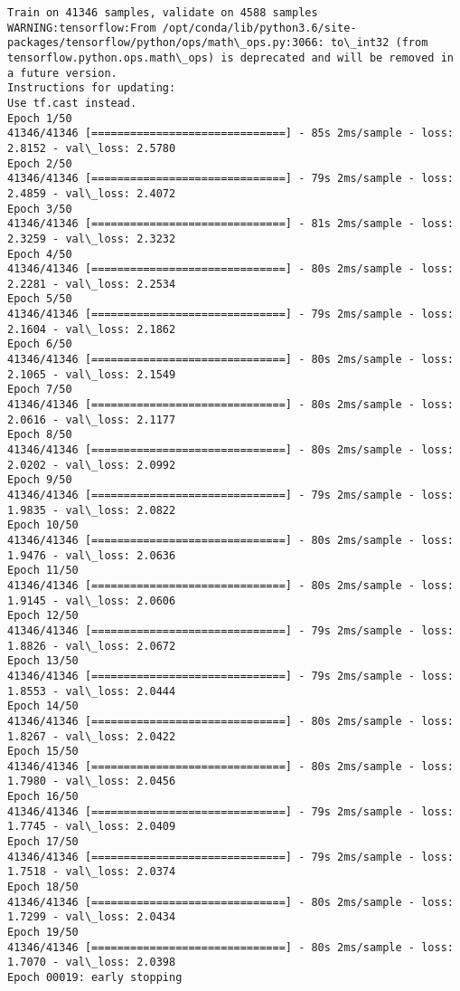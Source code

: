 \documentclass[11pt]{article}
\begin{document}
    \begin{Verbatim}[commandchars=\\\{\}]
Train on 41346 samples, validate on 4588 samples
WARNING:tensorflow:From /opt/conda/lib/python3.6/site-packages/tensorflow/python/ops/math\_ops.py:3066: to\_int32 (from tensorflow.python.ops.math\_ops) is deprecated and will be removed in a future version.
Instructions for updating:
Use tf.cast instead.
Epoch 1/50
41346/41346 [==============================] - 85s 2ms/sample - loss: 2.8152 - val\_loss: 2.5780
Epoch 2/50
41346/41346 [==============================] - 79s 2ms/sample - loss: 2.4859 - val\_loss: 2.4072
Epoch 3/50
41346/41346 [==============================] - 81s 2ms/sample - loss: 2.3259 - val\_loss: 2.3232
Epoch 4/50
41346/41346 [==============================] - 80s 2ms/sample - loss: 2.2281 - val\_loss: 2.2534
Epoch 5/50
41346/41346 [==============================] - 79s 2ms/sample - loss: 2.1604 - val\_loss: 2.1862
Epoch 6/50
41346/41346 [==============================] - 80s 2ms/sample - loss: 2.1065 - val\_loss: 2.1549
Epoch 7/50
41346/41346 [==============================] - 80s 2ms/sample - loss: 2.0616 - val\_loss: 2.1177
Epoch 8/50
41346/41346 [==============================] - 80s 2ms/sample - loss: 2.0202 - val\_loss: 2.0992
Epoch 9/50
41346/41346 [==============================] - 79s 2ms/sample - loss: 1.9835 - val\_loss: 2.0822
Epoch 10/50
41346/41346 [==============================] - 80s 2ms/sample - loss: 1.9476 - val\_loss: 2.0636
Epoch 11/50
41346/41346 [==============================] - 80s 2ms/sample - loss: 1.9145 - val\_loss: 2.0606
Epoch 12/50
41346/41346 [==============================] - 79s 2ms/sample - loss: 1.8826 - val\_loss: 2.0672
Epoch 13/50
41346/41346 [==============================] - 79s 2ms/sample - loss: 1.8553 - val\_loss: 2.0444
Epoch 14/50
41346/41346 [==============================] - 80s 2ms/sample - loss: 1.8267 - val\_loss: 2.0422
Epoch 15/50
41346/41346 [==============================] - 80s 2ms/sample - loss: 1.7980 - val\_loss: 2.0456
Epoch 16/50
41346/41346 [==============================] - 79s 2ms/sample - loss: 1.7745 - val\_loss: 2.0409
Epoch 17/50
41346/41346 [==============================] - 79s 2ms/sample - loss: 1.7518 - val\_loss: 2.0374
Epoch 18/50
41346/41346 [==============================] - 80s 2ms/sample - loss: 1.7299 - val\_loss: 2.0434
Epoch 19/50
41346/41346 [==============================] - 80s 2ms/sample - loss: 1.7070 - val\_loss: 2.0398
Epoch 00019: early stopping

    \end{Verbatim}
\end{document}
